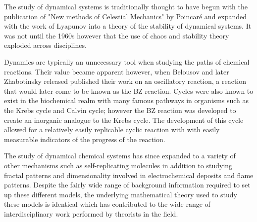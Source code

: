 The study of dynamical systems is traditionally thought to have begun with the publication of "New methods of Celestial Mechanics" by Poincar\'e and expanded with the work of Lyapunov into a theory of the stability of dynamical systems. It was not until the 1960s however that the use of chaos and stability theory exploded across disciplines\autocite{Aubin2002}. 

Dynamics are typically an unnecessary tool when studying the paths of chemical reactions. Their value became apparent however, when Belousov and later Zhabotinsky released published their work on an oscillatory reaction, a reaction that would later come to be known as the BZ reaction\autocite{Winfree1984}. Cycles were also known to exist in the biochemical realm with many famous pathways in organisms such as the Krebs cycle and Calvin cycle; however the BZ reaction was developed to create an inorganic analogue to the Krebs cycle\autocite{Field1986}. The development of this cycle allowed for a relatively easily replicable cyclic reaction with with easily measurable indicators of the progress of the reaction. 

The study of dynamical chemical systems has since expanded to a variety of other mechanisms such as self-replicating molecules\autocite{Beutel2007} in addition to studying fractal patterns and dimensionality involved in electrochemical deposits\autocite{Hudson1994} and flame patterns\autocite{Matalon2009}. Despite the fairly wide range of background information required to set up these different models, the underlying mathematical theory used to study these models is identical which has contributed to the wide range of interdisciplinary work performed by theorists in the field.
